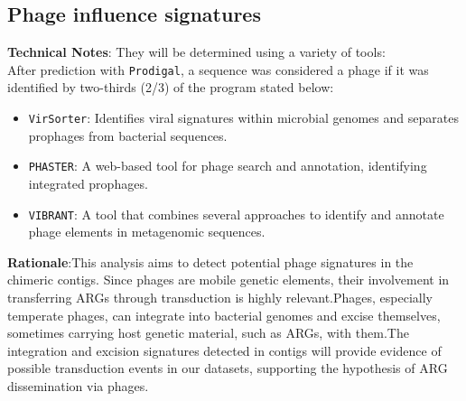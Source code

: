 \documentclass[11pt]{report}
\begin{document}
\subsection{Phage influence signatures}
\textbf{Technical Notes}: They will be determined using a variety of tools:\\
After prediction with \texttt{Prodigal}, a sequence was considered a phage if it was identified by two-thirds (2/3) of the program stated below: 
\begin{itemize}
	\item \texttt{VirSorter}: Identifies viral signatures within microbial genomes and separates prophages from bacterial sequences.
	\item \texttt{PHASTER}: A web-based tool for phage search and annotation, identifying integrated prophages.
	\item \texttt{VIBRANT}: A tool that combines several approaches to identify and annotate phage elements in metagenomic sequences.
\end{itemize}
\textbf{Rationale}:This analysis aims to detect potential phage signatures in the chimeric contigs. Since phages are mobile genetic elements, their involvement in transferring ARGs through transduction is highly relevant.Phages, especially temperate phages, can integrate into bacterial genomes and excise themselves, sometimes carrying host genetic material, such as ARGs, with them.The integration and excision signatures detected in contigs will provide evidence of possible transduction events in our datasets, supporting the hypothesis of ARG dissemination via phages.
\end{document}
